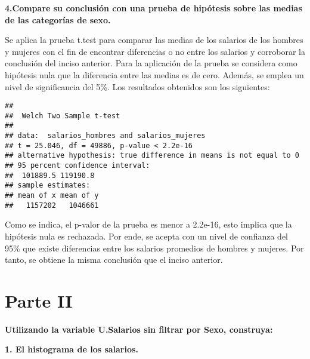 \documentclass[
]{article}
\newenvironment{Shaded}{\begin{snugshade}}{\end{snugshade}}
\newcommand{\DecValTok}[1]{\textcolor[rgb]{0.00,0.00,0.81}{#1}}
\newcommand{\FunctionTok}[1]{\textcolor[rgb]{0.13,0.29,0.53}{\textbf{#1}}}
\newcommand{\NormalTok}[1]{#1}
\newcommand{\OtherTok}[1]{\textcolor[rgb]{0.56,0.35,0.01}{#1}}
\newcommand{\SpecialCharTok}[1]{\textcolor[rgb]{0.81,0.36,0.00}{\textbf{#1}}}
\begin{document}
\textbf{4.Compare su conclusión con una prueba de hipótesis sobre las
medias de las categorías de sexo.}

Se aplica la prueba t.test para comparar las medias de los salarios de
los hombres y mujeres con el fin de encontrar diferencias o no entre los
salarios y corroborar la conclusión del inciso anterior. Para la
aplicación de la prueba se considera como hipótesis nula que la
diferencia entre las medias es de cero. Además, se emplea un nivel de
significancia del 5\%. Los resultados obtenidos son los siguientes:

\begin{Shaded}
\end{Shaded}

\begin{verbatim}
## 
##  Welch Two Sample t-test
## 
## data:  salarios_hombres and salarios_mujeres
## t = 25.046, df = 49886, p-value < 2.2e-16
## alternative hypothesis: true difference in means is not equal to 0
## 95 percent confidence interval:
##  101889.5 119190.8
## sample estimates:
## mean of x mean of y 
##   1157202   1046661
\end{verbatim}

Como se indica, el p-valor de la prueba es menor a 2.2e-16, esto implica
que la hipótesis nula es rechazada. Por ende, se acepta con un nivel de
confianza del 95\% que existe diferencias entre los salarios promedios
de hombres y mujeres. Por tanto, se obtiene la misma conclusión que el
inciso anterior.

\hypertarget{parte-ii}{%
\section{Parte II}\label{parte-ii}}

\textbf{Utilizando la variable U.Salarios sin filtrar por Sexo,
construya:}

\textbf{1. El histograma de los salarios.}
\end{document}
